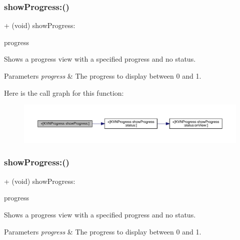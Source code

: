 \subsubsection{\texorpdfstring{show\+Progress\+:()}{showProgress:()}\hspace{0.1cm}{\footnotesize\ttfamily [1/3]}}
{\footnotesize\ttfamily + (void) show\+Progress\+: \begin{DoxyParamCaption}\item[{(C\+G\+Float)}]{progress }\end{DoxyParamCaption}}

Shows a progress view with a specified {\ttfamily progress} and no status. 
\begin{DoxyParams}{Parameters}
{\em progress} & The progress to display between 0 and 1. \\
\hline
\end{DoxyParams}
Here is the call graph for this function\+:\nopagebreak
\begin{figure}[H]
\begin{center}
\leavevmode
\includegraphics[width=350pt]{interface_k_v_n_progress_abc53102e1cb121a8b38c3337ce372517_cgraph}
\end{center}
\end{figure}
\mbox{\label{interface_k_v_n_progress_abc53102e1cb121a8b38c3337ce372517}} 
\subsubsection{\texorpdfstring{show\+Progress\+:()}{showProgress:()}\hspace{0.1cm}{\footnotesize\ttfamily [2/3]}}
{\footnotesize\ttfamily + (void) show\+Progress\+: \begin{DoxyParamCaption}\item[{(C\+G\+Float)}]{progress }\end{DoxyParamCaption}}

Shows a progress view with a specified {\ttfamily progress} and no status. 
\begin{DoxyParams}{Parameters}
{\em progress} & The progress to display between 0 and 1. \\
\hline
\end{DoxyParams}
\mbox{\label{interface_k_v_n_progress_abc53102e1cb121a8b38c3337ce372517}} 

